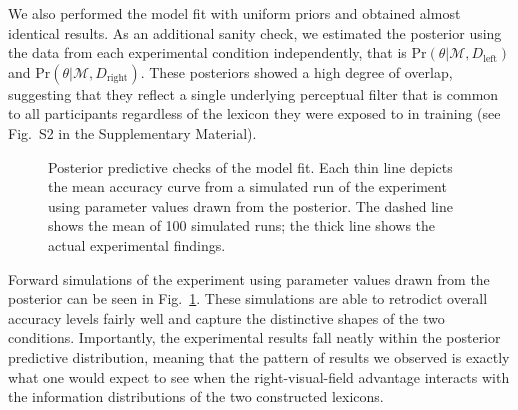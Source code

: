 \documentclass[doc,biblatex]{apa7}
\begin{document}
We also performed the model fit with uniform priors and obtained almost identical results. As an additional sanity check, we estimated the posterior using the data from each experimental condition independently, that is $\mathrm{Pr}(\theta|\mathcal{M},D_\mathrm{left})$ and $\mathrm{Pr}(\theta|\mathcal{M},D_\mathrm{right})$. These posteriors showed a high degree of overlap, suggesting that they reflect a single underlying perceptual filter that is common to all participants regardless of the lexicon they were exposed to in training (see Fig.~S2 in the Supplementary Material).

\begin{figure}
\vspace*{2pt}
\caption{Posterior predictive checks of the model fit. Each thin line depicts the mean accuracy curve from a simulated run of the experiment using parameter values drawn from the posterior. The dashed line shows the mean of 100 simulated runs; the thick line shows the actual experimental findings.}
\label{fig07}
\end{figure}

Forward simulations of the experiment using parameter values drawn from the posterior can be seen in Fig.~\ref{fig07}. These simulations are able to retrodict overall accuracy levels fairly well and capture the distinctive shapes of the two conditions. Importantly, the experimental results fall neatly within the posterior predictive distribution, meaning that the pattern of results we observed is exactly what one would expect to see when the right-visual-field advantage interacts with the information distributions of the two constructed lexicons.
\end{document}

